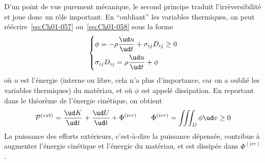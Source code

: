 D'un point de vue purement mécanique, le second principe traduit l'irréversibilité et joue donc un rôle important.
En ``oubliant'' les variables thermiques, on peut réécrire~\eqref{eq:Ch01-057} ou~\eqref{eq:Ch01-058} sous la forme
\begin{equation}
    \left\{
    \begin{aligned}
        & \phi = -\rho \frac{\ud u}{\ud t} + \sigma_{ij} D_{ij} \geq 0\\
        & \sigma_{ij} D_{ij} = \rho \frac{\ud u}{\ud t} + \phi
    \end{aligned}
    \right.
    \label{eq:Ch01-059}
\end{equation}
où $u$ est l'énergie (interne ou libre, cela n'a plus d'importance, car on a oublié les variables thermiques) du matériau, et où $\phi$ est appelé dissipation.
En reportant dans le théorème de l'énergie cinétique, on obtient 
\begin{equation}
    \mathcal{P}^{(ext)} = \frac{\ud K}{\ud t} + \frac{\ud U}{\ud t} + \Phi^{(irr)} \qquad \Phi^{(irr)} = \iiint_{D} \phi \ud v \geq 0
    \label{eq:Ch01-060}
\end{equation}
La puissance des efforts extérieurs, c'est-à-dire la puissance dépensée, contribue à augmenter l'énergie cinétique et l'énergie du matériau, et est dissipée dans $\Phi^{(irr)}$.

